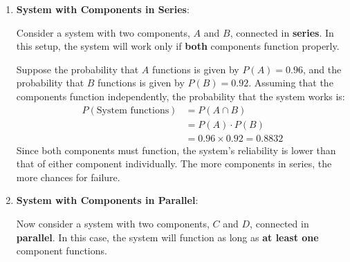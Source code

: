 \documentclass[twoside]{book}
\begin{document}
\begin{enumerate}

\item \textbf{System with Components in Series}:

Consider a system with two components, \( A \) and \( B \), connected in \textbf{series}. In this setup, the system will work only if \textbf{both} components function properly.

\begin{center}
\end{center}

Suppose the probability that $A$ functions is given by $P(A) = 0.96$, and the probability that $B$ functions is given by
$P(B) = 0.92$. Assuming that the components function independently, the probability that the system works is:
\[
\begin{aligned}
P(\text{System functions}) &= P(A \cap B) \\
&= P(A) \cdot P(B) \\
&= 0.96\times 0.92 = 0.8832
\end{aligned}
\]
Since both components must function, the system's reliability is lower than that of either component individually. The more components in series, the more chances for failure.

\item \textbf{System with Components in Parallel}:

Now consider a system with two components, \( C \) and \( D \), connected in \textbf{parallel}. In this case, the system will function as long as \textbf{at least one} component functions.

\begin{center}
\end{center}
\end{enumerate}
\end{document}
